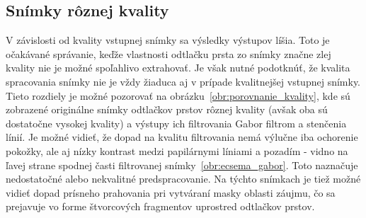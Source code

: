   \subsection{Snímky rôznej kvality}
  V závislosti od kvality vstupnej snímky sa výsledky výstupov líšia. Toto je očakávané správanie, keďže vlastnosti odtlačku prsta zo snímky značne zlej
  kvality nie je možné spoľahlivo extrahovať. Je však nutné podotknúť, že kvalita spracovania snímky nie je vždy žiaduca aj v prípade kvalitnejšej vstupnej
  snímky. Tieto rozdiely je možné pozorovať na obrázku~{\ref{obr:porovnanie_kvality}}, kde sú zobrazené originálne snímky odtlačkov prstov rôznej kvality
  (avšak oba sú dostatočne vysokej kvality) a výstupy ich filtrovania Gabor filtrom a stenčenia línií. Je možné vidieť, že dopad na kvalitu filtrovania
  nemá výlučne iba ochorenie pokožky, ale aj nízky kontrast medzi papilárnymi líniami a pozadím - vidno na ľavej strane spodnej časti filtrovanej
  snímky~{\ref{obr:ecsema_gabor}}. Toto naznačuje nedostatočné alebo nekvalitné predspracovanie. Na týchto snímkach je tiež možné vidieť dopad prísneho
  prahovania pri vytváraní masky oblasti záujmu, čo sa prejavuje vo forme štvorcových fragmentov uprostred odtlačkov prstov.

